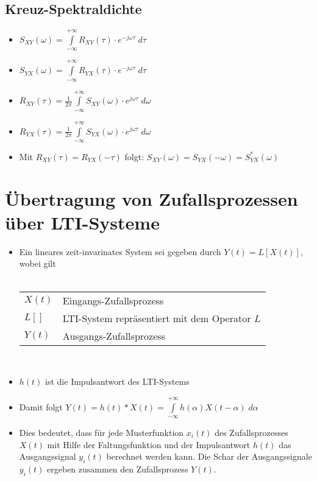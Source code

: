 \documentclass[10pt, a4paper]{article}
\begin{document}
\subsection{Kreuz-Spektraldichte}
\begin{itemize}
  \item $S_{XY}(\omega) = \int\limits_{-\infty}^{+\infty} 
                             R_{XY}(\tau) \cdot e^{-j\omega\tau} \; d\tau$ 
  \item $S_{YX}(\omega) = \int\limits_{-\infty}^{+\infty} 
                             R_{YX}(\tau) \cdot e^{-j\omega\tau} \; d\tau$ 
  \item $R_{XY}(\tau)   = \frac{1}{2\pi} \int\limits_{-\infty}^{+\infty} 
                             S_{XY}(\omega) \cdot e^{j\omega\tau} \; d\omega$ 
  \item $R_{YX}(\tau)   = \frac{1}{2\pi} \int\limits_{-\infty}^{+\infty} 
                             S_{YX}(\omega) \cdot e^{j\omega\tau} \; d\omega$ 
  \item Mit $R_{XY}(\tau) = R_{YX}(-\tau)$ folgt: \hspace{20pt}
          $S_{XY}(\omega) = S_{YX}(-\omega) = S^{\ast}_{YX}(\omega)$ 
\end{itemize} 

\clearpage
\section{\"Ubertragung von Zufallsprozessen \"uber LTI-Systeme}
\begin{itemize}
  \item Ein lineares zeit-invarinates System sei gegeben durch
        $Y(t) = L[X(t)]$, wobei gilt \\ \\
  \begin{tabular}{ll}
     $X(t)$ & Eingangs-Zufallsprozess \\
     $L[]$  & LTI-System repr\"asentiert mit dem Operator $L$ \\
     $Y(t)$ & Ausgangs-Zufallsprozess \\
  \end{tabular} \\
  \item $h(t)$ ist die Impulsantwort des LTI-Systems
  \item Damit folgt $Y(t) = h(t) \ast X(t)
                          = \int\limits_{-\infty}^{+\infty} h(\alpha)X(t-\alpha) \; d\alpha$
  \item Dies bedeutet, dass f\"ur jede Musterfunktion $x_{i}(t)$
        des Zufallsprozesses $X(t)$ mit Hilfe der Faltungsfunktion und der Impulsantwort 
        $h(t)$ das Ausgangssignal $y_{i}(t)$ berechnet werden kann.
        Die Schar der Ausgangssignale $y_{i}(t)$ ergeben zusammen den Zufallsprozess $Y(t)$.
\end{itemize} 
\end{document}
